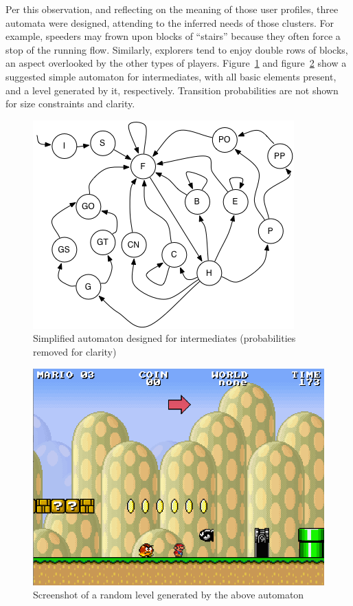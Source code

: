 \documentclass[conference]{IEEEtran}
\begin{document}
Per this observation, and reflecting on the meaning of those user profiles, three automata were designed, attending to the inferred needs of those clusters. For example, speeders may frown upon blocks of ``stairs'' because they often force a stop of the running flow. Similarly, explorers tend to enjoy double rows of blocks, an aspect overlooked by the other types of players. Figure~\ref{automaton} and figure~\ref{screenshot} show a suggested simple automaton for intermediates, with all basic elements present, and a level generated by it, respectively. Transition probabilities are not shown for size constraints and clarity.

\begin{figure}[htp]
\centerline{\includegraphics[width=0.75\columnwidth]{automaton.png}}
\caption{Simplified automaton designed for intermediates (probabilities removed for clarity)}
\label{automaton}
\end{figure}

\begin{figure}[htp]
\centerline{\includegraphics[width=0.75\columnwidth]{screenshot.png}}
\caption{Screenshot of a random level generated by the above automaton}
\label{screenshot}
\end{figure}
\end{document}

